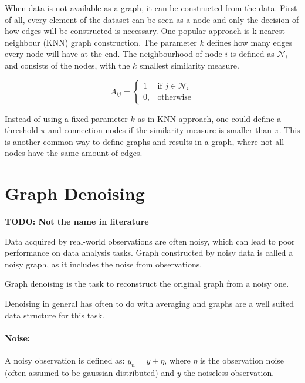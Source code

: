 \label{sec:graphConstruction}
When data is not available as a graph, it can be constructed from the data.
First of all, every element of the dataset can be seen as a node and only the decision of how edges will be constructed
is necessary. One popular approach is k-nearest neighbour (KNN) graph construction. The parameter $k$
defines how many edges every node will have at the end. The neighbourhood of node $i$ is defined
as $\mathcal{N}_i$ and consists of the nodes, with the $k$ smallest similarity measure.

\begin{equation}
    \label{eg:knn}
    A_{ij} =    
    \begin{cases}
        1  & \text{if } j \in \mathcal{N}_i \\
        0, & \text{otherwise}
    \end{cases}
\end{equation}

Instead of using a fixed parameter $k$ as in KNN approach, one could define a threshold $\pi$
and connection nodes if the similarity measure is smaller than $\pi$. This is another common way
to define graphs and results in a graph, where not all nodes have the same amount of edges.

\section{Graph Denoising}
\textbf{TODO: Not the name in literature}

Data acquired by real-world observations are often noisy, which can lead to poor 
performance on data analysis tasks. Graph constructed by noisy data is called
a noisy graph, as it includes the noise from observations.

Graph denoising is the task to reconstruct the original graph from a noisy one.


Denoising in general has often to do with averaging 
 and graphs are a well suited data structure for this task\cite{noneLocalMean}.

\paragraph{Noise:}
A noisy observation is defined as:
$y_n = y + \eta$, where $\eta$ is the observation noise (often assumed to be gaussian distributed)
and $y$ the noiseless observation.

